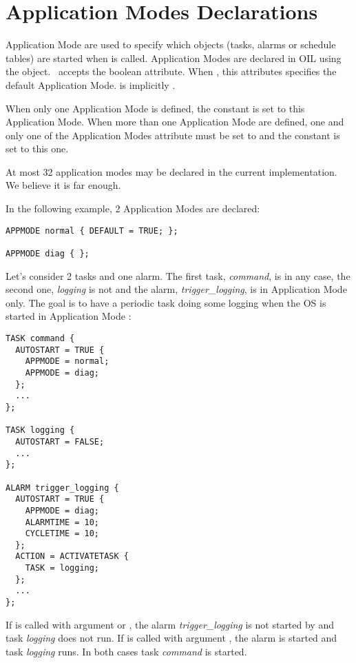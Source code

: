 \section{Application Modes Declarations}
\label{sec:appmodedec}

Application Mode are used to specify which  objects (tasks, alarms or schedule tables) are started when  is called. Application Modes are declared in OIL using the  object. \goil\ accepts the  boolean attribute. When , this attributes specifies the default Application Mode.  is implicitly .

When only one Application Mode is defined, the constant  is set to this Application Mode. When more than one Application Mode are defined, one and only one of the Application Modes   attribute must be set to  and the constant  is set to this one.

At most 32 application modes may be declared in the current implementation. We believe it is far enough.

In the following example, 2 Application Modes are declared:

\begin{lstlisting}[language=OIL]
APPMODE normal { DEFAULT = TRUE; };

APPMODE diag { };
\end{lstlisting}

Let's consider 2 tasks and one alarm. The first task, {\em command}, is  in any case, the second one, {\em logging} is not  and the alarm, {\em trigger_logging}, is  in Application Mode  only. The goal is to have a periodic task doing some logging when the OS is started in Application Mode :

\begin{lstlisting}[language=OIL]
TASK command {
  AUTOSTART = TRUE {
    APPMODE = normal;
    APPMODE = diag;
  };
  ...
};

TASK logging {
  AUTOSTART = FALSE;
  ...
};

ALARM trigger_logging {
  AUTOSTART = TRUE {
    APPMODE = diag;
    ALARMTIME = 10;
    CYCLETIME = 10;
  };
  ACTION = ACTIVATETASK {
    TASK = logging;
  };
  ...
};
\end{lstlisting}

If  is called with argument  or , the alarm {\em trigger_logging} is not started by  and task {\em logging} does not run. If  is called with argument , the alarm is started and task {\em logging} runs. In both cases task {\em command} is started.

